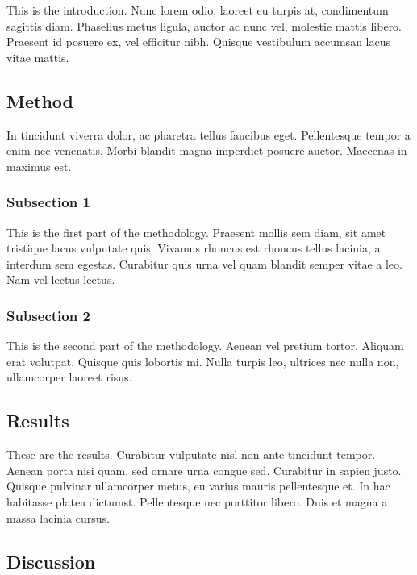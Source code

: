 \documentclass[11pt,letterpaper,]{article}
\begin{document}
This is the introduction. Nunc lorem odio, laoreet eu turpis at,
condimentum sagittis diam. Phasellus metus ligula, auctor ac nunc vel,
molestie mattis libero. Praesent id posuere ex, vel efficitur nibh.
Quisque vestibulum accumsan lacus vitae mattis.

\subsection{Method}\label{method-3}

In tincidunt viverra dolor, ac pharetra tellus faucibus eget.
Pellentesque tempor a enim nec venenatis. Morbi blandit magna imperdiet
posuere auctor. Maecenas in maximus est.

\subsubsection{Subsection 1}\label{subsection-1-2}

This is the first part of the methodology. Praesent mollis sem diam, sit
amet tristique lacus vulputate quis. Vivamus rhoncus est rhoncus tellus
lacinia, a interdum sem egestas. Curabitur quis urna vel quam blandit
semper vitae a leo. Nam vel lectus lectus.

\subsubsection{Subsection 2}\label{subsection-2-3}

This is the second part of the methodology. Aenean vel pretium tortor.
Aliquam erat volutpat. Quisque quis lobortis mi. Nulla turpis leo,
ultrices nec nulla non, ullamcorper laoreet risus.

\subsection{Results}\label{results-3}

These are the results. Curabitur vulputate nisl non ante tincidunt
tempor. Aenean porta nisi quam, sed ornare urna congue sed. Curabitur in
sapien justo. Quisque pulvinar ullamcorper metus, eu varius mauris
pellentesque et. In hac habitasse platea dictumst. Pellentesque nec
porttitor libero. Duis et magna a massa lacinia cursus.

\subsection{Discussion}\label{discussion-3}
\end{document}
